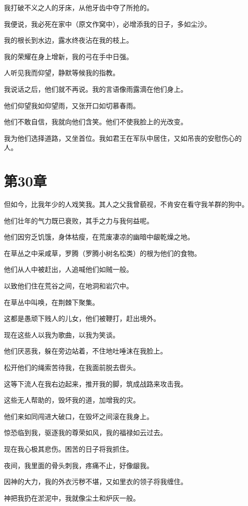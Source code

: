 \documentclass[12pt,oneside]{book}
\begin{document}
我打破不义之人的牙床，从他牙齿中夺了所抢的。

我便说，我必死在家中（原文作窝中），必增添我的日子，多如尘沙。

我的根长到水边，露水终夜沾在我的枝上。

我的荣耀在身上增新，我的弓在手中日强。

人听见我而仰望，静默等候我的指教。

我说话之后，他们就不再说。我的言语像雨露滴在他们身上。

他们仰望我如仰望雨，又张开口如切慕春雨。

他们不敢自信，我就向他们含笑。他们不使我脸上的光改变。

我为他们选择道路，又坐首位。我如君王在军队中居住，又如吊丧的安慰伤心的人。


\chapter{第30章}
但如今，比我年少的人戏笑我。其人之父我曾藐视，不肯安在看守我羊群的狗中。

他们壮年的气力既已衰败，其手之力与我何益呢。

他们因穷乏饥饿，身体枯瘦，在荒废凄凉的幽暗中龈乾燥之地。

在草丛之中采咸草，罗腾（罗腾小树名松类）的根为他们的食物。

他们从人中被赶出，人追喊他们如贼一般。

以致他们住在荒谷之间，在地洞和岩穴中。

在草丛中叫唤，在荆棘下聚集。

这都是愚顽下贱人的儿女，他们被鞭打，赶出境外。

现在这些人以我为歌曲，以我为笑谈。

他们厌恶我，躲在旁边站着，不住地吐唾沫在我脸上。

松开他们的绳索苦待我，在我面前脱去辔头。

这等下流人在我右边起来，推开我的脚，筑成战路来攻击我。

这些无人帮助的，毁坏我的道，加增我的灾。

他们来如同闯进大破口，在毁坏之间滚在我身上。

惊恐临到我，驱逐我的尊荣如风，我的福禄如云过去。

现在我心极其悲伤。困苦的日子将我抓住。

夜间，我里面的骨头刺我，疼痛不止，好像龈我。

因神的大力，我的外衣污秽不堪，又如里衣的领子将我缠住。

神把我扔在淤泥中，我就像尘土和炉灰一般。
\end{document}
